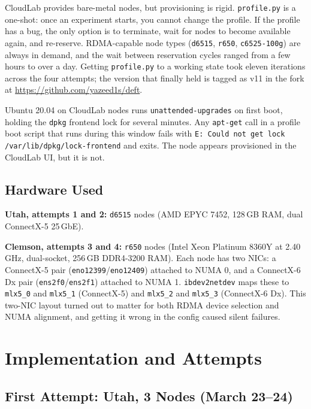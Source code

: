 \documentclass[10pt]{article}
\begin{document}
CloudLab provides bare-metal nodes, but provisioning is rigid.
\texttt{profile.py} is a one-shot: once an experiment starts, you cannot change
the profile.
If the profile has a bug, the only option is to terminate, wait for nodes to
become available again, and re-reserve.
RDMA-capable node types (\texttt{d6515}, \texttt{r650}, \texttt{c6525-100g})
are always in demand, and the wait between reservation cycles ranged from
a few hours to over a day.
Getting \texttt{profile.py} to a working state took eleven iterations across
the four attempts; the version that finally held is tagged as v11 in the
fork at \url{https://github.com/yazeed1s/deft}.

Ubuntu 20.04 on CloudLab nodes runs \texttt{unattended-upgrades} on first boot,
holding the \texttt{dpkg} frontend lock for several minutes.
Any \texttt{apt-get} call in a profile boot script that runs during this window
fails with \texttt{E: Could not get lock /var/lib/dpkg/lock-frontend} and exits.
The node appears provisioned in the CloudLab UI, but it is not.

\subsection{Hardware Used}

\textbf{Utah, attempts 1 and 2:} \texttt{d6515} nodes (AMD EPYC 7452, 128\,GB RAM,
dual ConnectX-5 25\,GbE).

\textbf{Clemson, attempts 3 and 4:} \texttt{r650} nodes (Intel Xeon Platinum 8360Y
at 2.40\,GHz, dual-socket, 256\,GB DDR4-3200 RAM).
Each node has two NICs: a ConnectX-5 pair (\texttt{eno12399}/\texttt{eno12409})
attached to NUMA 0, and a ConnectX-6 Dx pair (\texttt{ens2f0}/\texttt{ens2f1})
attached to NUMA 1.
\texttt{ibdev2netdev} maps these to \texttt{mlx5\_0} and \texttt{mlx5\_1}
(ConnectX-5) and \texttt{mlx5\_2} and \texttt{mlx5\_3} (ConnectX-6 Dx).
This two-NIC layout turned out to matter for both RDMA device selection and
NUMA alignment, and getting it wrong in the config caused silent failures.

\section{Implementation and Attempts}

\subsection{First Attempt: Utah, 3 Nodes (March 23--24)}
\end{document}
